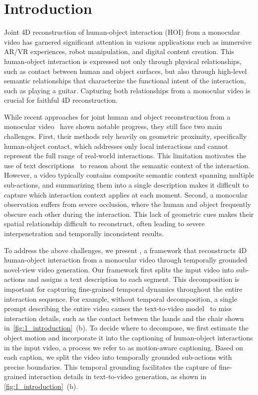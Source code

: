 \section{Introduction}
\label{sec:introduction}
Joint 4D reconstruction of human-object interaction (HOI) from a monocular video has garnered significant attention in various applications such as immersive AR/VR experiences, robot manipulation, and digital content creation.
This human-object interaction is expressed not only through physical relationships, such as contact between human and object surfaces, but also through high-level semantic relationships that characterize the functional intent of the interaction, such as playing a guitar.
Capturing both relationships from a monocular video is crucial for faithful 4D reconstruction.


While recent approaches for joint human and object reconstruction from a monocular video~\cite{xu2021d3d,xie2023visibility,xue2026rhino,xie2026cari4d,wen2025efficient} have shown notable progress, they still face two main challenges. 
First, their methods rely heavily on geometric proximity, specifically human-object contact, which addresses only local interactions and cannot represent the full range of real-world interactions.
This limitation motivates the use of text descriptions~\cite{nam2026tehor} to reason about the semantic context of the interaction.
However, a video typically contains composite semantic context spanning multiple sub-actions, and summarizing them into a single description makes it difficult to capture which interaction context applies at each moment.
Second, a monocular observation suffers from severe occlusion, where the human and object frequently obscure each other during the interaction.
This lack of geometric cues makes their spatial relationship difficult to reconstruct, often leading to severe interpenetration and temporally inconsistent results.





To address the above challenges, we present \textbf{\ourmethod}, a framework that reconstructs 4D human-object interaction from a monocular video through temporally grounded novel-view video generation.
Our framework first splits the input video into sub-actions and assigns a text description to each segment.
This decomposition is important for capturing fine-grained temporal dynamics throughout the entire interaction sequence.
For example, without temporal decomposition, a single prompt describing the entire video causes the text-to-video model~\cite{wan2025wan} to miss interaction details, such as the contact between the hands and the chair shown in~\cref{fig:1_introduction}~(b).
To decide where to decompose, we first estimate the object motion and incorporate it into the captioning of human-object interactions in the input video, a process we refer to as motion-aware captioning.
Based on each caption, we split the video into temporally grounded sub-actions with precise boundaries.
This temporal grounding facilitates the capture of fine-grained interaction details in text-to-video generation, as shown in \cref{fig:1_introduction}~(b).



